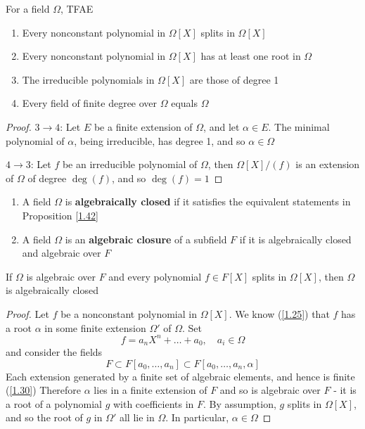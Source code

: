 \documentclass[11pt]{article}
\begin{document}
\begin{proposition}[]
\label{1.42}
For a field \(\Omega\), TFAE
\begin{enumerate}
\item Every nonconstant polynomial in \(\Omega[X]\) splits in \(\Omega[X]\)
\item Every nonconstant polynomial in \(\Omega[X]\) has at least one root in \(\Omega\)
\item The irreducible polynomials in \(\Omega[X]\) are those of degree 1
\item Every field of finite degree over \(\Omega\) equals \(\Omega\)
\end{enumerate}
\end{proposition}

\begin{proof}
\(3\to 4\): Let \(E\) be a finite extension of \(\Omega\), and let \(\alpha\in E\). The minimal polynomial of \(\alpha\),
being irreducible, has degree 1, and so \(\alpha\in\Omega\)

\(4\to 3\): Let \(f\) be an irreducible polynomial of \(\Omega\), then \(\Omega[X]/(f)\) is an extension of
\(\Omega\) of degree \(\deg(f)\), and so \(\deg(f)=1\)
\end{proof}

\begin{definition}[]
\begin{enumerate}
\item A field \(\Omega\) is \textbf{algebraically closed} if it satisfies the equivalent statements in Proposition \ref{1.42}
\item A field \(\Omega\) is an \textbf{algebraic closure} of a subfield \(F\) if it is algebraically closed and
algebraic over \(F\)
\end{enumerate}
\end{definition}

\begin{proposition}[]
\label{1.44}
If \(\Omega\) is algebraic over \(F\) and every polynomial \(f\in F[X]\) splits in \(\Omega[X]\), then \(\Omega\) is
algebraically closed
\end{proposition}

\begin{proof}
Let \(f\) be a nonconstant polynomial in \(\Omega[X]\). We know (\ref{1.25}) that \(f\) has a root
\(\alpha\) in some finite extension \(\Omega'\) of \(\Omega\). Set
\begin{equation*}
f=a_nX^n+\dots+a_0,\quad a_i\in\Omega
\end{equation*}
and consider the fields
\begin{equation*}
F\subset F[a_0,\dots,a_n]\subset F[a_0,\dots,a_n,\alpha]
\end{equation*}
Each extension generated by a finite set of algebraic elements, and hence is finite (\ref{1.30})
Therefore \(\alpha\) lies in a finite extension of \(F\) and so is algebraic over \(F\) - it is a root of
a polynomial \(g\) with coefficients in \(F\). By assumption, \(g\) splits in \(\Omega[X]\), and so
the root of \(g\) in \(\Omega'\) all lie in \(\Omega\). In particular, \(\alpha\in\Omega\)
\end{proof}
\end{document}
